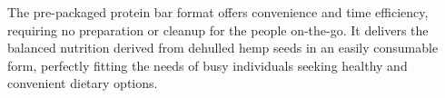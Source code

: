 \vspace{1em}
The pre-packaged protein bar format offers convenience and time efficiency, requiring no preparation or cleanup for the people on-the-go. It delivers the balanced nutrition derived from dehulled hemp seeds in an easily consumable form, perfectly fitting the needs of busy individuals seeking healthy and convenient dietary options.


